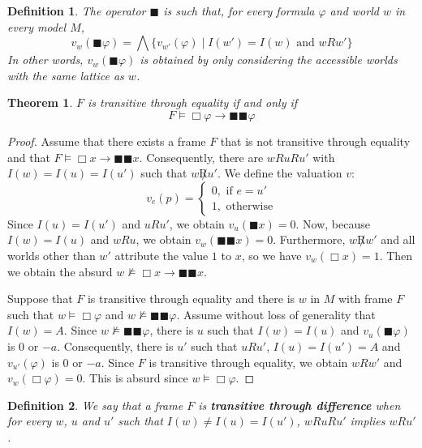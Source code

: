 \documentclass{amsart}
\newtheorem{definition}{Definition}[section]
\newtheorem{theorem}{Theorem}[section]
\newcommand{\so}{\rightarrow}
\newcommand{\bBox}{\blacksquare}
\begin{document}
\begin{definition} The operator $\bBox$ is such that, for every formula $\varphi$ and world $w$ in every model $M$,
    $$v_w(\bBox \varphi) = \bigwedge \{v_{w'}(\varphi) \mid I(w') = I(w) \text{ and } w R w'\}$$
    In other words, $v_w(\bBox \varphi)$ is obtained by only considering the accessible worlds with the same lattice as $w$.
\end{definition}

\begin{theorem}
    $F$ is transitive through equality if and only if 
    $$ F \vDash \Box \varphi \so \bBox \bBox \varphi$$
\end{theorem}

\begin{proof}
    Assume that there exists a frame $F$ that is not transitive through equality and that $F \vDash \Box x \so \bBox \bBox x$. Consequently, there are $w R u R u'$ with $I(w) = I(u) = I(u')$ such that $w \not R u'$. We define the valuation $v$:
    $$v_e(p) = \begin{cases}
        0, \text{ if } e = u' \\
        1, \text{ otherwise}
    \end{cases}$$
    Since $I(u) = I(u')$ and $u R u'$, we obtain $v_u(\bBox x) = 0$. Now, because $I(w) = I(u)$ and $w R u$, we obtain $v_w(\bBox \bBox x) = 0$. Furthermore, $w \not R w'$ and all worlds other than $w'$ attribute the value $1$ to $x$, so we have $v_w(\Box x) = 1$. Then we obtain the absurd $w \nvDash \Box x \so \bBox \bBox x$.

    Suppose that $F$ is transitive through equality and there is $w$ in $M$ with frame $F$ such that $w \vDash \Box \varphi$ and $w \nvDash \bBox \bBox \varphi$. Assume without loss of generality that $I(w) = A$. Since $w \nvDash \bBox \bBox \varphi$, there is $u$ such that $I(w) = I(u)$ and $v_u(\bBox \varphi)$ is $0$ or $-a$. Consequently, there is $u'$ such that $u R u'$, $I(u) = I(u') = A$ and $v_{u'}(\varphi)$ is $0$ or $-a$.
    Since $F$ is transitive through equality, we obtain $w R w'$ and $v_w(\Box \varphi) = 0$. This is absurd since $w \vDash \Box \varphi$.
\end{proof}

\begin{definition}
    We say that a frame $F$ is \textbf{transitive through difference} when for every $w$, $u$ and $u'$ such that
    $I(w) \neq I(u) = I(u')$, $w R u R u'$ implies $w R u'$.
\end{definition}
\end{document}
